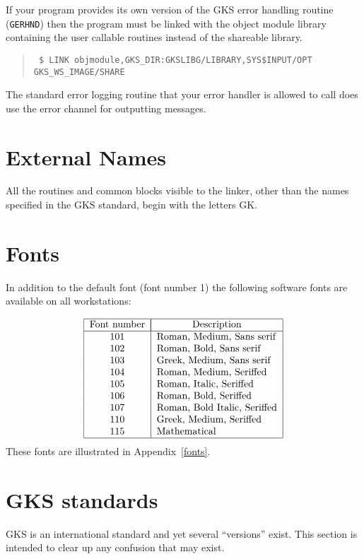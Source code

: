 If your program provides its own version of the GKS error handling routine
({\tt GERHND}) then the program must be linked with the object module library
containing the user callable routines instead of the shareable library.
\begin{quote}\tt
\$ LINK objmodule,GKS\_DIR:GKSLIBG/LIBRARY,SYS\$INPUT/OPT\\
GKS\_WS\_IMAGE/SHARE
\end{quote}
The standard error logging routine that your error handler is allowed to call
does use the error channel for outputting messages.

\section{External Names}
All the routines and common blocks visible to the linker, other than the 
names specified in the GKS standard, begin with the letters GK.

\section{Fonts}
In addition to the default font (font number 1) the following software fonts
are available on all workstations:

\[\begin{tabular}{|c|l|}\hline
Font number &\multicolumn{1}{|c|}{Description}\\\hline
 101 &Roman, Medium, Sans serif\\
 102 &Roman, Bold, Sans serif\\
 103 &Greek, Medium, Sans serif\\
 104 &Roman, Medium, Seriffed\\
 105 &Roman, Italic, Seriffed\\
 106 &Roman, Bold, Seriffed\\
 107 &Roman, Bold Italic, Seriffed\\
 110 &Greek, Medium, Seriffed\\
 115 &Mathematical\\\hline
\end{tabular}\]
These fonts are illustrated in Appendix~\ref{fonts}.
\section{GKS standards}
GKS is an international standard and yet several ``versions'' exist.
This section is intended to clear up any confusion that may exist.

